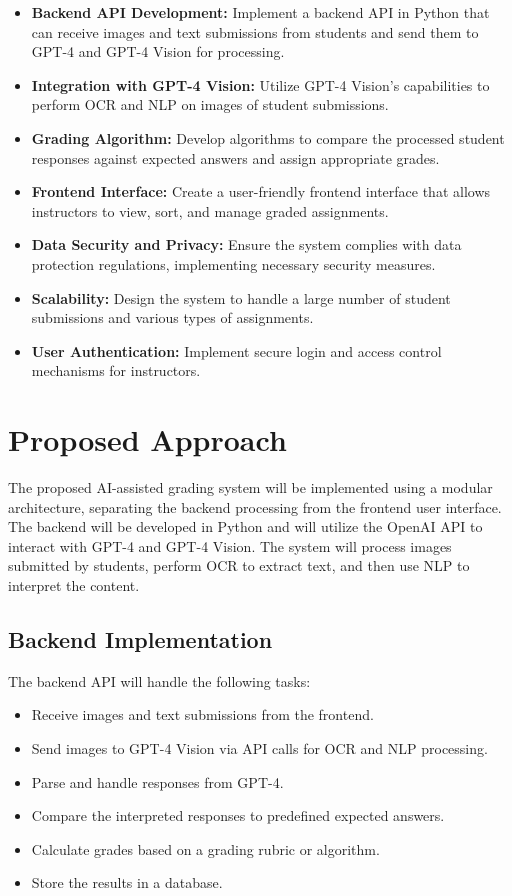 \documentclass[ms,twoside,print]{nuthesis}
\begin{document}
\begin{itemize}
    \item \textbf{Backend API Development:} Implement a backend API in Python that can receive images and text submissions from students and send them to GPT-4 and GPT-4 Vision for processing.
    \item \textbf{Integration with GPT-4 Vision:} Utilize GPT-4 Vision's capabilities to perform OCR and NLP on images of student submissions.
    \item \textbf{Grading Algorithm:} Develop algorithms to compare the processed student responses against expected answers and assign appropriate grades.
    \item \textbf{Frontend Interface:} Create a user-friendly frontend interface that allows instructors to view, sort, and manage graded assignments.
    \item \textbf{Data Security and Privacy:} Ensure the system complies with data protection regulations, implementing necessary security measures.
    \item \textbf{Scalability:} Design the system to handle a large number of student submissions and various types of assignments.
    \item \textbf{User Authentication:} Implement secure login and access control mechanisms for instructors.
\end{itemize}

\section{Proposed Approach}

The proposed AI-assisted grading system will be implemented using a modular architecture, separating the backend processing from the frontend user interface. The backend will be developed in Python and will utilize the OpenAI API to interact with GPT-4 and GPT-4 Vision. The system will process images submitted by students, perform OCR to extract text, and then use NLP to interpret the content.

\subsection{Backend Implementation}

The backend API will handle the following tasks:

\begin{itemize}
    \item Receive images and text submissions from the frontend.
    \item Send images to GPT-4 Vision via API calls for OCR and NLP processing.
    \item Parse and handle responses from GPT-4.
    \item Compare the interpreted responses to predefined expected answers.
    \item Calculate grades based on a grading rubric or algorithm.
    \item Store the results in a database.
\end{itemize}
\end{document}
